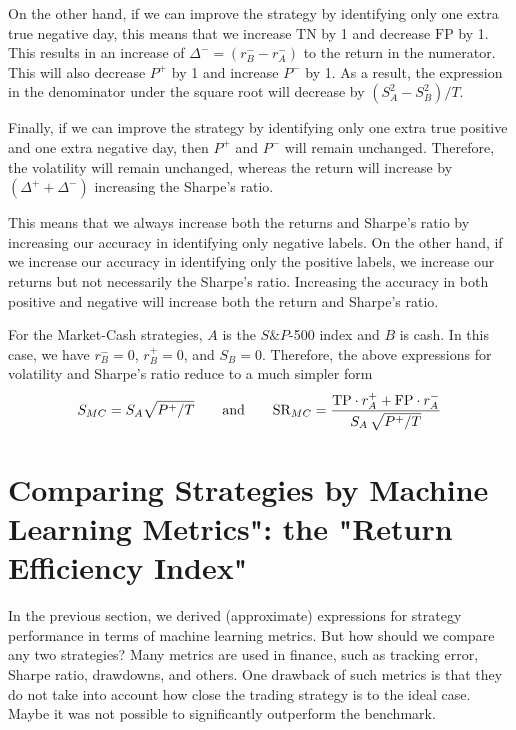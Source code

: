 \documentclass{article}
\begin{document}
On the other hand, if we can improve the strategy by identifying only one extra true negative day,
this means that we increase $\text{TN}$ by 1 and decrease $\text{FP}$ by 1. This results in an increase of $\Delta^{-}=(r_{B}^{-}-r_{A}^{-})$ to the return in the numerator. This will also decrease $P^{+}$ by 1 and 
increase $P^{-}$ by 1. As a result, the expression in the denominator under the square root will decrease by $(S_{A}^{2}-S_{B}^{2})/T$.

Finally, if we can improve the strategy by identifying only one extra true positive and one extra negative day, then $P^{+}$ and $P^{-}$
will remain unchanged. Therefore, the volatility will remain unchanged, whereas the return will increase  by $(\Delta^{+}+\Delta^{-})$
increasing the Sharpe's ratio.

This means that we always increase both the returns and Sharpe's ratio by increasing our accuracy in identifying only negative labels. 
On the other hand, if we increase our accuracy in identifying only the positive labels, we increase our returns but not necessarily the Sharpe's ratio.
Increasing the accuracy in both positive and negative will increase both the return and Sharpe's ratio.

For the Market-Cash strategies, $A$ is the $S{\&}P$-500 index and $B$ is cash. In this case,  we have $r_{B}^{-}=0$, $r_{B}^{+}=0$, and $S_{B}=0$. Therefore, the above expressions
for volatility and Sharpe's ratio reduce to a much simpler form
\begin{equation}
S_{MC} = S_{A} \sqrt{ P^{+}/T}  \qquad \hbox{and} \qquad 
\text{SR}_{MC}=
\frac{\text{TP}\cdot r_{A}^{+} +     \text{FP}\cdot r_{A}^{-}}
{S_{A}\,\sqrt{P^{+}/T}}
\end{equation}


\section{Comparing Strategies by Machine Learning Metrics":  the "Return Efficiency Index"}
\label{section_return_efficiency_index}

In the previous section, we derived (approximate) expressions for strategy performance in terms of machine learning metrics. 
But how should we compare any two strategies? Many metrics are used in finance, such as tracking error, Sharpe ratio, drawdowns, and others. One drawback of such metrics is that they do not take into account how close the trading strategy is to the ideal case. Maybe it was not possible to significantly outperform the benchmark. 
\end{document}
